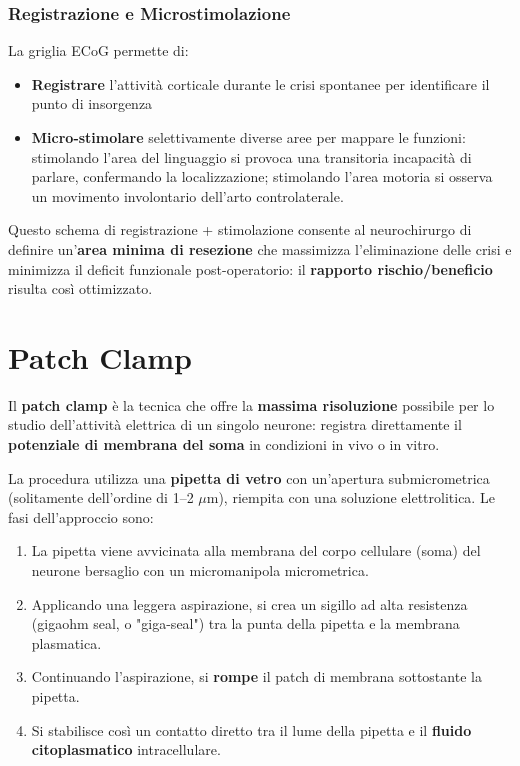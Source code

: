 \subsubsection{Registrazione e Microstimolazione}

La griglia ECoG permette di:

\begin{itemize}
    \item \textbf{Registrare} l'attività corticale durante le crisi spontanee per identificare il punto di insorgenza
    \item \textbf{Micro-stimolare} selettivamente diverse aree per mappare le funzioni: stimolando l'area del linguaggio si provoca una transitoria incapacità di parlare, confermando la localizzazione; stimolando l'area motoria si osserva un movimento involontario dell'arto controlaterale.
\end{itemize}

Questo schema di registrazione + stimolazione consente al neurochirurgo di definire un'\textbf{area minima di resezione} che massimizza l'eliminazione delle crisi e minimizza il deficit funzionale post-operatorio: il \textbf{rapporto rischio/beneficio} risulta così ottimizzato.


\section{Patch Clamp}

Il \textbf{patch clamp} è la tecnica che offre la \textbf{massima risoluzione} possibile per lo studio dell'attività elettrica di un singolo neurone: registra direttamente il \textbf{potenziale di membrana del soma} in condizioni in vivo o in vitro.

La procedura utilizza una \textbf{pipetta di vetro} con un'apertura submicrometrica (solitamente dell'ordine di 1–2 $\mu$m), riempita con una soluzione elettrolitica. Le fasi dell'approccio sono:

\begin{enumerate}
    \item La pipetta viene avvicinata alla membrana del corpo cellulare (soma) del neurone bersaglio con un micromanipola micrometrica.
    \item Applicando una leggera aspirazione, si crea un sigillo ad alta resistenza (gigaohm seal, o "giga-seal") tra la punta della pipetta e la membrana plasmatica.
    \item Continuando l'aspirazione, si \textbf{rompe} il patch di membrana sottostante la pipetta.
    \item Si stabilisce così un contatto diretto tra il lume della pipetta e il \textbf{fluido citoplasmatico} intracellulare.
\end{enumerate}

